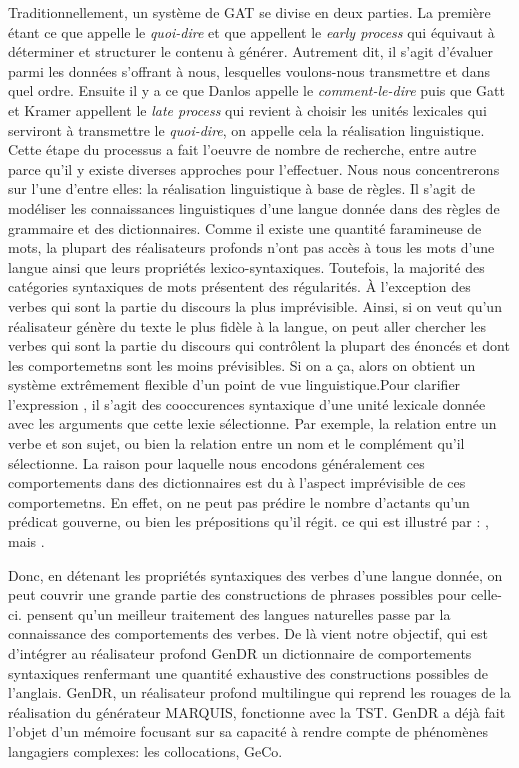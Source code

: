 Traditionnellement, un système de \ac{GAT} se divise en deux parties. La première étant ce que \cite{DanlosPresentationmodelegeneration1983} appelle le \emph{quoi-dire} et que \cite{gatt18} appellent le \emph{early process} qui équivaut à déterminer et structurer le contenu à générer. Autrement dit, il s'agit d'évaluer parmi les données s'offrant à nous, lesquelles voulons-nous transmettre et dans quel ordre. Ensuite il y a ce que Danlos appelle le \emph{comment-le-dire} puis que Gatt et Kramer appellent le \emph{late process} qui revient à choisir les unités lexicales qui serviront à transmettre le \emph{quoi-dire}, on appelle cela la réalisation linguistique. Cette étape du processus a fait l'oeuvre de nombre de recherche, entre autre parce qu'il y existe diverses approches pour l'effectuer. Nous nous concentrerons sur l'une d'entre elles: la réalisation linguistique à base de règles. Il s'agit de modéliser les connaissances linguistiques d'une langue donnée dans des règles de grammaire et des dictionnaires. Comme il existe une quantité faramineuse de mots, la plupart des réalisateurs profonds n'ont pas accès à tous les mots d'une langue ainsi que leurs propriétés lexico-syntaxiques. Toutefois, la majorité des catégories syntaxiques de mots présentent des régularités. À l'exception des verbes qui sont la partie du discours la plus imprévisible. Ainsi, si on veut qu'un réalisateur génère du texte le plus fidèle à la langue, on peut aller chercher les verbes qui sont la partie du discours qui contrôlent la plupart des énoncés et dont les comportemetns sont les moins prévisibles. Si on a ça, alors on obtient un système extrêmement flexible d'un point de vue linguistique.Pour clarifier l'expression , il s'agit des cooccurences syntaxique d'une unité lexicale donnée avec les arguments que cette lexie sélectionne. Par exemple, la relation entre un verbe et son sujet, ou bien la relation entre un nom et le complément qu'il sélectionne. La raison pour laquelle nous encodons généralement ces comportements dans des dictionnaires est du à l'aspect imprévisible de ces comportemetns. En effet, on ne peut pas prédire le nombre d'actants qu'un prédicat gouverne, ou bien les prépositions qu'il régit. ce qui est illustré par \cite{MilicevicSchemaregimepont2009}: , mais .

Donc, en détenant les propriétés syntaxiques des verbes d'une langue donnée, on peut couvrir une grande partie des constructions de phrases possibles pour celle-ci. \cite{SchulerVerbnetBroadcoverageComprehensive2005,Korhonenlargesubcategorizationlexicon2006} pensent qu'un meilleur traitement des langues naturelles passe par la connaissance des comportements des verbes. De là vient notre objectif, qui est d'intégrer au réalisateur profond GenDR un dictionnaire de comportements syntaxiques renfermant une quantité exhaustive des constructions possibles de l'anglais. GenDR, un réalisateur profond multilingue qui reprend les rouages de la réalisation du générateur MARQUIS, fonctionne avec la TST. GenDR a déjà fait l'objet d'un mémoire focusant sur sa capacité à rendre compte de phénomènes langagiers complexes: les collocations, GeCo. 

